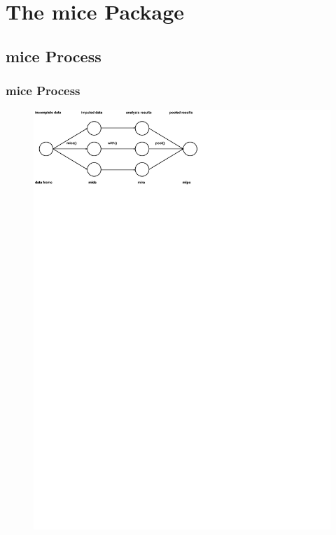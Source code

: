 \documentclass[UKenglish
  pdftex                    %
  dvipsnames                %
]{beamer}
\newcommand{\pk}[1]{\textcolor{Rblue}{\textsf{#1}}}
\begin{document}
\section{The \pk{mice} Package}

\subsection{\pk{mice} Process}
\begin{frame}\frametitle{\pk{mice} Process \normalsize\parencite{vanbuuren:2011}}

\begin{figure}
  \centering
  \includegraphics[width=\textwidth]{./Figures/sketch.pdf}
\end{figure}

\end{frame}
\end{document}
